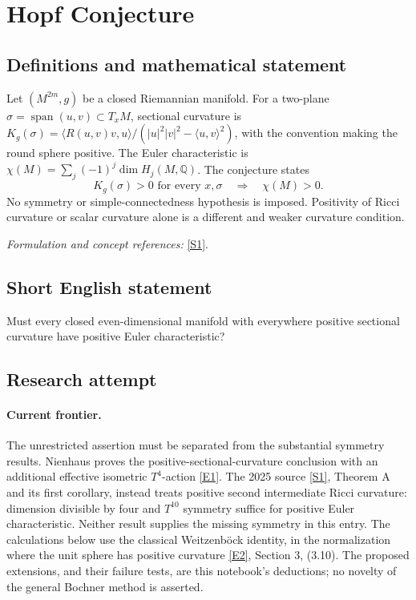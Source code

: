 \documentclass[11pt,a4paper]{article}
\newcommand{\Q}{\mathbb{Q}}
\newcommand{\sref}[2]{\hyperlink{source:#1:#2}{[S#2]}}
\newcommand{\eref}[2]{\hyperlink{extra:#1:#2}{[E#2]}}
\newif\ifshowcatalogue
\newcommand{\cataloguescope}[1]{\ifshowcatalogue
 \paragraph{Exact scope in the supplied catalogue.}
 \begin{quote}\small #1\end{quote}\fi}
\begin{document}
\setcounter{section}{0}
\clearpage
\section*{\texorpdfstring{Hopf Conjecture}{Hopf Conjecture}}\label{statement}
\subsection{Definitions and mathematical statement}
Let $(M^{2m},g)$ be a closed Riemannian manifold. For a two-plane $\sigma=\operatorname{span}(u,v)\subset T_xM$, sectional curvature is
$K_g(\sigma)=\langle R(u,v)v,u\rangle/(|u|^2|v|^2-\langle u,v\rangle^2)$, with the convention making the round sphere positive. The Euler characteristic is
$\chi(M)=\sum_j(-1)^j\dim H_j(M,\Q)$. The conjecture states
\[
 K_g(\sigma)>0\text{ for every }x,\sigma
 \quad\Longrightarrow\quad\chi(M)>0.
\]
No symmetry or simple-connectedness hypothesis is imposed. Positivity of Ricci curvature or scalar curvature alone is a different and weaker curvature condition.
\par\smallskip\textit{Formulation and concept references:} \sref{statement}{1}.
\cataloguescope{Prove that every closed even-dimensional Riemannian manifold whose sectional curvatures are everywhere positive has positive Euler characteristic.}
\subsection{Short English statement}
Must every closed even-dimensional manifold with everywhere positive sectional curvature have positive Euler characteristic?
\subsection{Research attempt}

\paragraph{Current frontier.}
The unrestricted assertion must be separated from the substantial symmetry
results. Nienhaus proves the positive-sectional-curvature conclusion with an
additional effective isometric $T^4$-action \eref{statement}{1}. The 2025 source
\sref{statement}{1}, Theorem A and its first corollary, instead treats positive second
intermediate Ricci curvature: dimension divisible by four and $T^{10}$ symmetry
suffice for positive Euler characteristic. Neither result supplies the missing
symmetry in this entry. The calculations below use the classical
Weitzenb\"ock identity, in the normalization where the unit sphere has positive
curvature \eref{statement}{2}, Section 3, (3.10). The proposed extensions, and their
failure tests, are this notebook's deductions; no novelty of the general
Bochner method is asserted.
\end{document}
